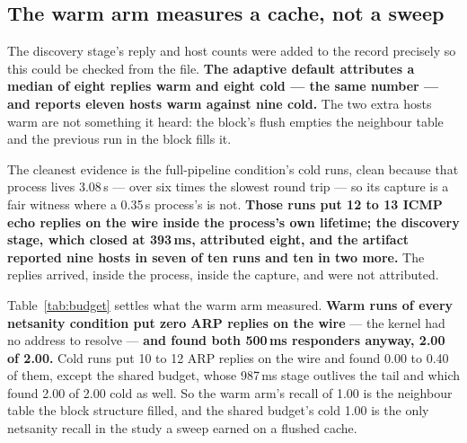 \documentclass[conference]{IEEEtran}
\newcommand{\netsanity}{\textsf{netsanity}}
\begin{document}
\begin{table}[tb]
\caption{The declaration budget, read off the record. \emph{echo wire} is ICMP
echo replies in the run's own capture, \emph{attr.}\ what the discovery stage
attributed, \emph{rep.}\ what the artifact reported, \emph{slow} how many of
the two 500\,ms responders were found on average. Warm runs put \emph{zero} ARP
replies on the wire and still report both slow hosts: the neighbour table
already held them.}
\label{tab:budget}
\centering

\end{table}

\subsection{The warm arm measures a cache, not a sweep}
\label{sec:cache}

The discovery stage's reply and host counts were added to the record precisely
so this could be checked from the file. \textbf{The adaptive default attributes
a median of eight replies warm and eight cold --- the same number --- and
reports eleven hosts warm against nine cold.} The two extra hosts warm are not
something it heard: the block's flush empties the neighbour table and the
previous run in the block fills it.

The cleanest evidence is the full-pipeline condition's cold runs, clean because
that process lives 3.08\,s --- over six times the slowest round trip --- so its
capture is a fair witness where a 0.35\,s process's is not. \textbf{Those runs
put 12 to 13 ICMP echo replies on the wire inside the process's own lifetime;
the discovery stage, which closed at 393\,ms, attributed eight, and the
artifact reported nine hosts in seven of ten runs and ten in two more.} The
replies arrived, inside the process, inside the capture, and were not
attributed.

Table~\ref{tab:budget} settles what the warm arm measured. \textbf{Warm runs of
every \netsanity{} condition put zero ARP replies on the wire} --- the kernel
had no address to resolve --- \textbf{and found both 500\,ms responders anyway,
2.00 of 2.00.} Cold runs put 10 to 12 ARP replies on the wire and found 0.00 to
0.40 of them, except the shared budget, whose 987\,ms stage outlives the tail
and which found 2.00 of 2.00 cold as well. So the warm arm's recall of 1.00 is
the neighbour table the block structure filled, and the shared budget's cold
1.00 is the only \netsanity{} recall in the study a sweep earned on a flushed
cache.
\end{document}
